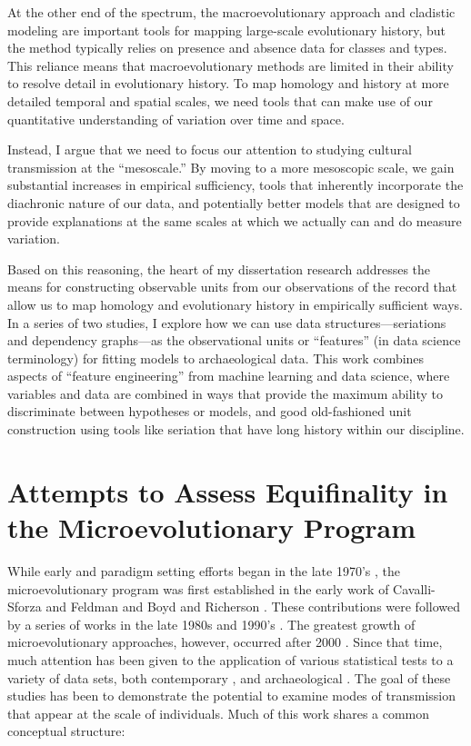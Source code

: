 At the other end of the spectrum, the macroevolutionary approach and cladistic modeling are important tools for mapping large-scale evolutionary history, but the method typically relies on presence and absence data for classes and types. This reliance means that macroevolutionary methods are limited in their ability to resolve detail in evolutionary history. To map homology and history at more detailed temporal and spatial scales, we need tools that can make use of our quantitative understanding of variation over time and space.

Instead, I argue that we need to focus our attention to studying cultural transmission at the ``mesoscale.'' By moving to a more mesoscopic scale, we gain substantial increases in empirical sufficiency, tools that inherently incorporate the diachronic nature of our data, and potentially better models that are designed to provide explanations at the same scales at which we actually can and do measure variation.

Based on this reasoning, the heart of my dissertation research addresses the means for constructing observable units from our observations of the record that allow us to map homology and evolutionary history in empirically sufficient ways. In a series of two studies, I explore how we can use data structures—seriations and dependency graphs—as the observational units or ``features'' (in data science terminology) for fitting models to archaeological data. This work combines aspects of ``feature engineering'' from machine learning and data science, where variables and data are combined in ways that provide the maximum ability to discriminate between hypotheses or models, and good old-fashioned unit construction using tools like seriation that have long history within our discipline.

\section{Attempts to Assess Equifinality in the Microevolutionary Program}

While early and paradigm setting efforts began in the late 1970's , the microevolutionary program was first established in the early work of Cavalli-Sforza and Feldman \citeyearpar{CF1981} and Boyd and Richerson \citeyearpar{BR1985}.  These contributions were followed by a series of works in the late 1980s and 1990's .  The greatest growth of microevolutionary approaches, however, occurred after 2000 .  Since that time, much attention has been given to the application of various statistical tests to a variety of data sets, both contemporary , and archaeological .  The goal of these studies has been to demonstrate the potential to examine modes of transmission that appear at the scale of individuals.  Much of this work shares a common conceptual structure:

